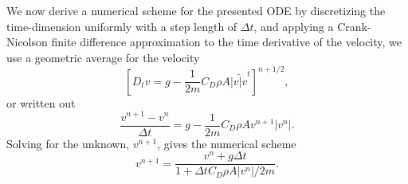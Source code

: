 \documentclass[a4paper, 11pt, titlepage, english]{article}
\begin{document}
We now derive a numerical scheme for the presented ODE by discretizing the time-dimension uniformly with a step length of $\Delta t$, and applying a Crank-Nicolson finite difference approximation to the time derivative of the velocity, we use a geometric average for the velocity
$$[D_t v = g - \frac{1}{2m}C_D \rho A \bar{|v|v}^t]^{n+1/2},$$
or written out
$$\frac{v^{n+1} - v^n}{\Delta t} = g - \frac{1}{2m}C_D \rho A v^{n+1}|v^n|.$$
Solving for the unknown, $v^{n+1}$, gives the numerical scheme
$$v^{n+1} = \frac{v^n + g \Delta t}{1 + \Delta t C_D \rho A |v^n|/2m}.$$
\end{document}
